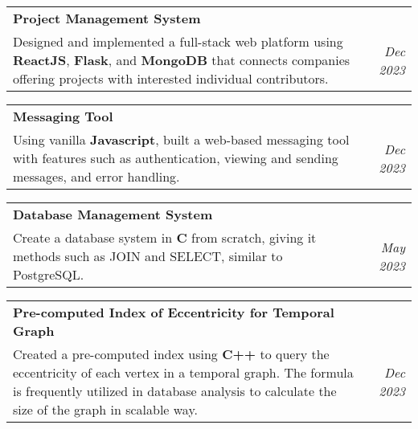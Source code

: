\documentclass[a4paper,20pt]{article}
\makeatletter
\newcommand{\resumeSubItem}[2]{%
  \item\small{%
    \begin{tabular*}{0.97\textwidth}{@{}p{0.82\textwidth}@{\extracolsep{\fill}}r}
      #1 & \textit{#2}
    \end{tabular*}\vspace{-2pt}
  }
}
\makeatother
\begin{document}
\resumeSubItem{\textbf{Project Management System} \href{https://github.com/sorryfornow/ProjectManagementSystem}{\faGithub}\\
Designed and implemented a full-stack web platform using \textbf{ReactJS}, \textbf{Flask}, and \textbf{MongoDB} that connects companies offering projects with interested individual contributors.}
{Dec 2023}


\resumeSubItem{\textbf{Messaging Tool} \href{https://github.com/sorryfornow/Slack_r}{\faGithub}\\
Using vanilla \textbf{Javascript}, built a web-based messaging tool with features such as authentication, viewing and sending messages, and error handling.}
{Dec 2023}



\resumeSubItem{\textbf{Database Management System} \href{https://github.com/sorryfornow/DBMS}{\faGithub}\\
Create a database system in \textbf{C} from scratch, giving it methods such as JOIN and SELECT, similar to PostgreSQL.}
{May 2023}



\resumeSubItem{\textbf{Pre-computed Index of Eccentricity for Temporal Graph} \href{https://github.com/sorryfornow/ecc_sample}{\faGithub}\\
Created a pre-computed index using \textbf{C++} to query the eccentricity of each vertex in a temporal graph. The formula is frequently utilized in database analysis to calculate the size of the graph in scalable way.}
{Dec 2023}
\end{document}
